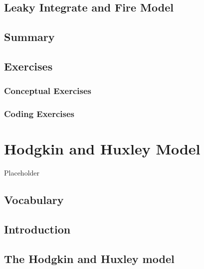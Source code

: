 \documentclass[
]{book}
\begin{document}
\hypertarget{leaky-integrate-and-fire-model}{%
\section{Leaky Integrate and Fire Model}\label{leaky-integrate-and-fire-model}}

\hypertarget{summary}{%
\section{Summary}\label{summary}}

\hypertarget{exercises}{%
\section{Exercises}\label{exercises}}

\hypertarget{conceptual-exercises}{%
\subsection{Conceptual Exercises}\label{conceptual-exercises}}

\hypertarget{coding-exercises}{%
\subsection{Coding Exercises}\label{coding-exercises}}

\hypertarget{Ch4}{%
\chapter{Hodgkin and Huxley Model}\label{Ch4}}

Placeholder

\hypertarget{vocabulary}{%
\section{Vocabulary}\label{vocabulary}}

\hypertarget{introduction}{%
\section{Introduction}\label{introduction}}

\hypertarget{the-hodgkin-and-huxley-model}{%
\section{The Hodgkin and Huxley model}\label{the-hodgkin-and-huxley-model}}
\end{document}
